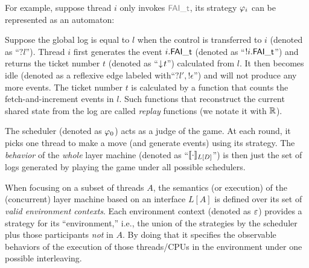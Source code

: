 For example, suppose thread $i$ only invokes  $\commc{FAI\_t}$, its strategy $\varphi_{i}$  can be represented as an automaton:%
\begin{center}
\end{center}%
Suppose the global log is equal to $l$ when the control is transferred to $i$  (denoted as ``$?l$''). Thread $i$  first generates the event
$i.\mathsf{\textcolor{black}{FAI\_t}}$ (denoted as ``$!i.\mathsf{\textcolor{black}{FAI\_t}}$'') and returns the ticket number $t$ (denoted as ``$\downarrow\! t$'') calculated from $l$. It then becomes idle (denoted as a reflexive edge labeled with``$?l',!\epsilon$'')
and will not produce any more events.
The ticket number $t$ is calculated by a  function that counts the fetch-and-increment events in $l$. Such functions that reconstruct the current shared state from the log are called \emph{replay} functions (we notate it with $\mathbb{R}$).

The scheduler (denoted as $\varphi_{0}$) acts as a judge of the game.
At each round, it picks one thread to make a move (and generate events) using its strategy. The \emph{behavior} of the \emph{whole} layer machine (denoted as ``$[\![\cdot]\!]_{L[D]}$'') is then just the set of  logs generated by playing the game under all possible schedulers.

When focusing on a subset of threads $A$, the semantics (or execution) of the (concurrent) layer machine based on an
interface $L[A]$ is defined over its set of \emph{valid environment
contexts}. Each environment context (denoted as $\oracle$) provides a
strategy for its ``environment,'' i.e., the union of the strategies
by the scheduler plus those participants {\em not} in $A$.
By doing that it specifies the observable behaviors of the
execution of those threads/CPUs in the environment under one possible
interleaving.

